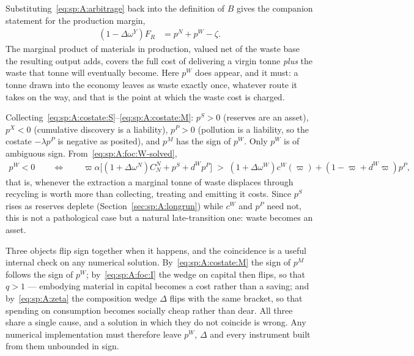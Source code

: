 Substituting~\eqref{eq:sp:A:arbitrage} back into the definition of $B$ gives the companion statement
for the production margin,
\begin{align}
\left(1-\Delta\omega^Y\right)F_R &= p^N+p^W-\zeta .
\label{eq:sp:A:FR}
\end{align}
The marginal product of materials in production, valued net of the waste base the resulting output
adds, covers the full cost of delivering a virgin tonne \emph{plus} the waste that tonne will
eventually become. Here $p^W$ does appear, and it must: a tonne drawn into the economy leaves as
waste exactly once, whatever route it takes on the way, and that is the point at which the waste cost
is charged.

 Collecting~\eqref{eq:sp:A:costate:S}--\eqref{eq:sp:A:costate:M}:
$p^S>0$ (reserves are an asset), $p^X<0$ (cumulative discovery is a liability), $p^P>0$ (pollution is
a liability, so the costate $-\lambda p^P$ is negative as posited), and $p^M$ has the sign of $p^W$.
Only $p^W$ is of ambiguous sign. From~\eqref{eq:sp:A:foc:W-solved},
\begin{align}
p^W<0
\qquad\Longleftrightarrow\qquad
\varpi\alpha\Big[\left(1+\Delta\omega^N\right)C^N_N+p^S+d^Wp^P\Big]
\;>\;
\left(1+\Delta\omega^W\right)c^W\!\left(\varpi\right)+\left(1-\varpi+d^W\varpi\right)p^P,
\label{eq:sp:A:pW-sign}
\end{align}
that is, whenever the extraction a marginal tonne of waste displaces through recycling is worth more
than collecting, treating and emitting it costs. Since $p^S$ rises as reserves deplete
(Section~\ref{sec:sp:A:longrun}) while $c^W$ and $p^P$ need not, this is not a pathological case but a
natural late-transition one: waste becomes an asset.

Three objects flip sign together when it happens, and the coincidence is a useful internal check on
any numerical solution. By~\eqref{eq:sp:A:costate:M} the sign of $p^M$ follows the sign of $p^W$;
by~\eqref{eq:sp:A:foc:I} the wedge on capital then flips, so that $q>1$ --- embodying material in
capital becomes a cost rather than a saving; and by~\eqref{eq:sp:A:zeta} the composition wedge
$\Delta$ flips with the same bracket, so that spending on consumption becomes socially cheap rather
than dear. All three share a single cause, and a solution in which they do not coincide is wrong. Any
numerical implementation must therefore leave $p^W$, $\Delta$ and every instrument built from them
unbounded in sign.

